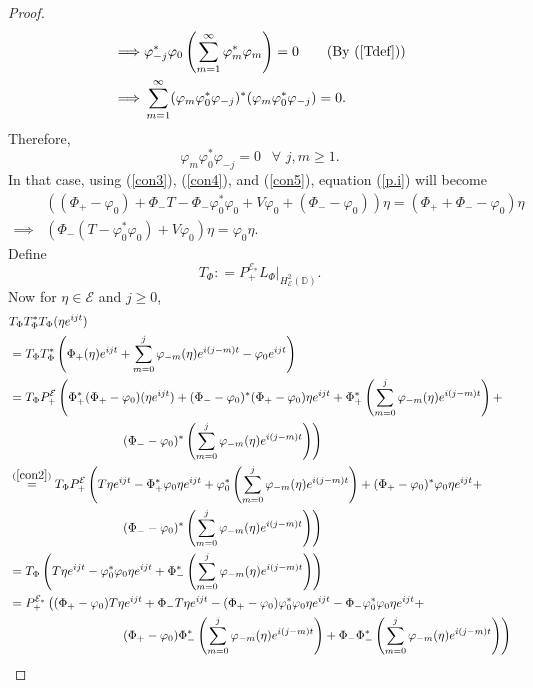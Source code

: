 \documentclass[12pt]{amsart}
\newcommand{\cle}{\mathcal{E}}
\newcommand{\D}{\mathbb{D}}
\theoremstyle{definition}
\theoremstyle{plain}
\theoremstyle{definition}
\numberwithin{equation}{section}
\let\phi=\varphi
\begin{document}
\begin{proof}
\begin{align*}
\implies &\phi_{-j}^*\phi_0\left(\sum\limits_{m=1}^\infty \phi_m^*\phi_m\right)=0 \quad\quad (\text{By (\ref{Tdef})})\\
\implies & \sum\limits_{m=1}^\infty (\phi_m\phi_0^*\phi_{-j})^*(\phi_m\phi_0^*\phi_{-j})=0.
\end{align*}
Therefore, 
\begin{equation}\label{con5}
\phi_{m}\phi_0^*\phi_{-j}=0 \,\, ~~ \forall \,\,j,m \geq 1.
\end{equation}
In that case, using (\ref{con3}), (\ref{con4}), and (\ref{con5}), equation (\ref{p.i}) will become
\begin{align}
	&((\Phi_+-\phi_0)+\Phi_-T-\Phi_-\phi_0^*\phi_0+V\phi_0+(\Phi_--\phi_0))\eta=(\Phi_++\Phi_--\phi_0)\eta \nonumber\\ 
	\implies & (\Phi_-(T-\phi_0^*\phi_0)+V\phi_0)\eta=\phi_0\eta. \label{con6}
\end{align}
Define 
\[
T_\Phi: = P_{+}^{\cle_{*}}L_{\Phi}|_{ H^2_\cle(\D)}.
\]
Now for $\eta \in \cle$ and $j \geq 0$,
\begin{align*}
&T_\Phi T_\Phi^*T_\Phi(\eta e^{ijt})\\
&=T_\Phi T_\Phi^*\left(\Phi_+(\eta)e^{ijt}+\sum\limits_{m=0}^j \phi_{-m}(\eta)e^{i(j-m)t}-\phi_0e^{ijt}\right)\\
&=T_\Phi P_+^{\cle}\left(\Phi_+^*(\Phi_+-\phi_0)(\eta e^{ijt})+(\Phi_--\phi_0)^*(\Phi_+-\phi_0)\eta e^{ijt}+\Phi_+^*\left(\sum\limits_{m=0}^j \phi_{-m}(\eta) e^{i(j-m)t}\right)+\right.\\
&\quad\quad\quad\quad\quad\quad\quad\quad\quad\left.(\Phi_--\phi_0)^*\left(\sum\limits_{m=0}^j \phi_{-m}(\eta)e^{i(j-m)t}\right)\right)\\
&\stackrel{(\ref{con2})}{=}T_\Phi P_+^{\cle} \left(T\eta e^{ijt}-\Phi_+^*\phi_0\eta e^{ijt}+\phi_0^*\left(\sum\limits_{m=0}^j \phi_{-m}(\eta)e^{i(j-m)t}\right)+(\Phi_+-\phi_0)^*\phi_0\eta e^{ijt}+\right.\\
&\quad\quad\quad\quad\quad\quad\quad\quad\quad\left.(\Phi_--\phi_0)^*\left(\sum\limits_{m=0}^j \phi_{-m}(\eta)e^{i(j-m)t}\right)\right)\\
&=T_\Phi\left(T\eta e^{ijt}-\phi_0^*\phi_0 \eta e^{ijt}+\Phi_-^*\left(\sum\limits_{m=0}^j \phi_{-m}(\eta)e^{i(j-m)t}\right)\right)\\
&=P_+^{\cle_*}\left((\Phi_+-\phi_0)T\eta e^{ijt}+\Phi_-T\eta e^{ijt}-(\Phi_+-\phi_0)\phi_0^*\phi_0\eta e^{ijt}-\Phi_-\phi_0^*\phi_0\eta e^{ijt}+\right.\\
&\quad\quad\quad\quad\quad\quad\quad\quad\quad\left.(\Phi_+-\phi_0)\Phi_-^*\left(\sum\limits_{m=0}^j\phi_{-m}(\eta)e^{i(j-m)t}\right)+\Phi_-\Phi_-^*\left(\sum\limits_{m=0}^j\phi_{-m}(\eta)e^{i(j-m)t}\right)\right)\\

\end{align*}
\end{proof}
\end{document}
